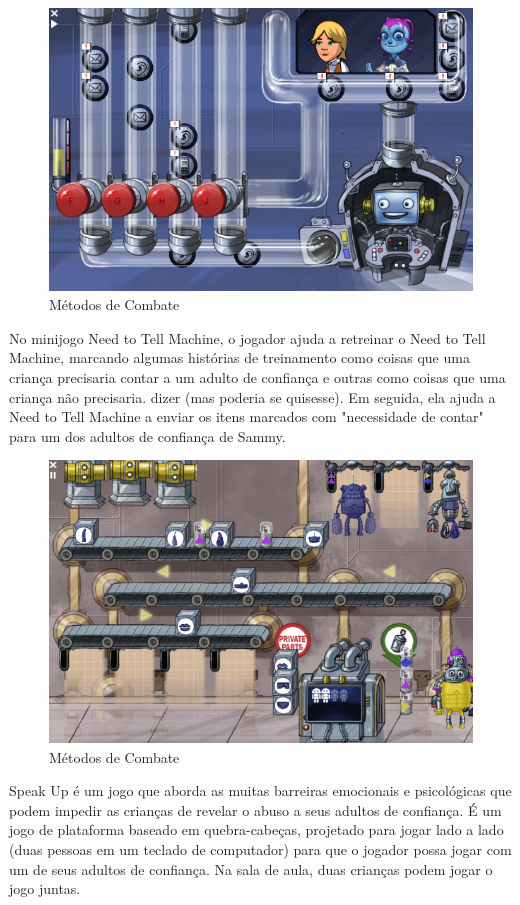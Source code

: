 \begin{figure}[htb]

	\caption{\label{fig:Riscos}Métodos de Combate}
  \begin{center}
    \includegraphics[width=0.6\linewidth]{./Figuras/Orbit/need-to-tell.png}
	\end{center}

\end{figure}

No minijogo Need to Tell Machine, o jogador ajuda a retreinar o Need to Tell Machine, marcando algumas histórias de treinamento como coisas que uma criança precisaria contar a um adulto de confiança e outras como coisas que uma criança não precisaria. dizer (mas poderia se quisesse). Em seguida, ela ajuda a Need to Tell Machine a enviar os itens marcados com "necessidade de contar" para um dos adultos de confiança de Sammy.



\begin{figure}[htb]

	\caption{\label{fig:Riscos}Métodos de Combate}
  \begin{center}
    \includegraphics[width=0.6\linewidth]{./Figuras/Orbit/robot-factory-screenshot.png}
	\end{center}

\end{figure}

Speak Up é um jogo que aborda as muitas barreiras emocionais e psicológicas que podem impedir as crianças de revelar o abuso a seus adultos de confiança. É um jogo de plataforma baseado em quebra-cabeças, projetado para jogar lado a lado (duas pessoas em um teclado de computador) para que o jogador possa jogar com um de seus adultos de confiança. Na sala de aula, duas crianças podem jogar o jogo juntas.

